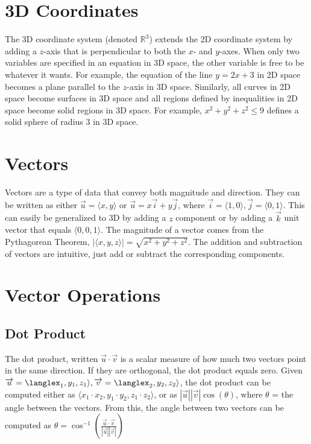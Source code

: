 \section{3D Coordinates}

The 3D coordinate system (denoted $\mathbb{R}^3$) extends the 2D coordinate system by adding a $z$-axis that is perpendicular to both the $x$- and $y$-axes. When only two variables are specified in an equation in 3D space, the other variable is free to be whatever it wants. For example, the equation of the line $y = 2x + 3$ in 2D space becomes a plane parallel to the $z$-axis in 3D space. Similarly, all curves in 2D space become surfaces in 3D space and all regions defined by inequalities in 2D space become solid regions in 3D space. For example, $x^2 + y^2 + z^2 \leq 9$ defines a solid sphere of radius 3 in 3D space.

\section{Vectors}

Vectors are a type of data that convey both magnitude and direction. They can be written as either $\overrightarrow{u} = \langle x, y\rangle$ or $\overrightarrow{u} = x\overrightarrow{i} + y\overrightarrow{j}$, where $\overrightarrow{i} = \langle1, 0\rangle, \overrightarrow{j} = \langle0, 1\rangle$. This can easily be generalized to 3D by adding a $z$ component or by adding a $\overrightarrow{k}$ unit vector that equals $\langle0, 0, 1\rangle$. The magnitude of a vector comes from the Pythagorean Theorem, $|\langle x, y, z\rangle| = \sqrt{x^2 + y^2 + z^2}$. The addition and subtraction of vectors are intuitive, just add or subtract the corresponding components.

\section{Vector Operations}

\subsection{Dot Product}
The dot product, written $\overrightarrow{u} \cdot \overrightarrow{v}$ is a scalar measure of how much two vectors point in the same direction. If they are orthogonal, the dot product equals zero. Given $\overrightarrow{u} = \langlex_1, y_1, z_1\rangle, \overrightarrow{v} = \langlex_2, y_2, z_2\rangle$, the dot product can be computed either as $\langle x_1 \cdot x_2, y_1 \cdot y_2, z_1 \cdot z_2\rangle$, or as $|\overrightarrow{u}||\overrightarrow{v}|\cos(\theta)$, where $\theta$ = the angle between the vectors. From this, the angle between two vectors can be computed as $\theta = \cos^{-1}(\frac{\overrightarrow{u} \cdot \overrightarrow{v}}{|\overrightarrow{u}||\overrightarrow{v}|})$

